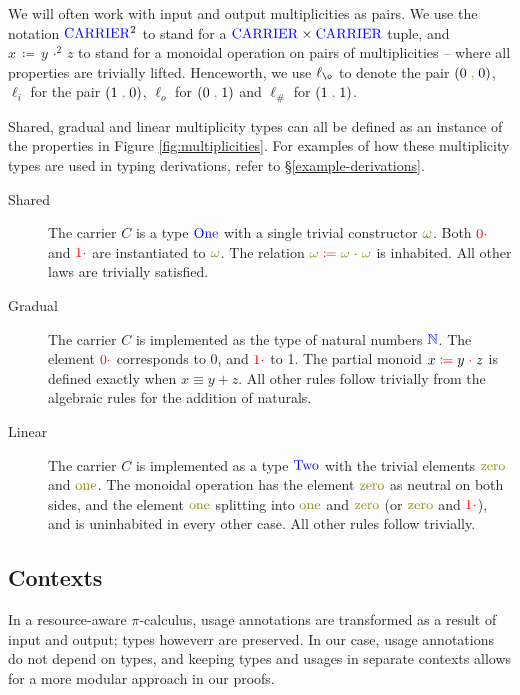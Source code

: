 \documentclass[a4paper,UKenglish,cleveref, autoref, thm-restate,authorcolumns]{lipics-v2019}
\theoremstyle{definition}
\newcommand{\picalc}{$\pi$-calculus}
\newcommand{\type}[1]{\textcolor{blue}{\operatorname{#1}}}
\newcommand{\constr}[1]{\textcolor{olive}{\operatorname{#1}}}
\newcommand{\field}[1]{\textcolor{red}{\operatorname{#1}}}
\newcommand{\comma}{\; \constr{,} \;}
\newcommand{\opsquared}[3]{#1 \, \coloneqq \, #2 \, \cdot^2 \, #3}
\newcommand{\op}[3]{#1 \; \field{\coloneqq} \; #2 \; \field{\cdot} \; #3}
\newcommand{\zero}{\field{0\cdot}}
\newcommand{\one}{\field{1\cdot}}
\newcommand{\Carrier}{\type{CARRIER}}
\newcommand{\N}{\type{\mathbb{N}}}
\begin{document}
\begin{note}
  We will often work with input and output multiplicities as pairs.
  We use the notation $\Carrier^2$ to stand for a $\Carrier \times \Carrier$ tuple, and $\opsquared{x}{y}{z}$ to stand for a monoidal operation on pairs of multiplicities -- where all properties are trivially lifted.
  Henceworth, we use $\ell_{\o}$ to denote the pair $(0 \comma 0)$, $\ell_i$ for the pair $(1 \comma 0)$, $\ell_o$ for $(0 \comma 1)$ and $\ell_{\#}$ for $(1 \comma 1)$.
\end{note}

Shared, gradual and linear multiplicity types can all be defined as an instance of the properties in Figure \ref{fig:multiplicities}.
For examples of how these multiplicity types are used in typing derivations, refer to \S \ref{example-derivations}.

\begin{description}
  \item [Shared]
    The carrier $C$ is a type $\type{One}$ with a single trivial constructor $\constr{\omega}$.
    Both $\zero$ and $\one$ are instantiated to $\constr{\omega}$.
    The relation $\op{\constr{\omega}}{\constr{\omega}}{\constr{\omega}}$ is inhabited.
    All other laws are trivially satisfied.
  \item [Gradual]
    The carrier $C$ is implemented as the type of natural numbers $\N$.
    The element $\zero$ corresponds to 0, and $\one$ to 1.
    The partial monoid $\op{x}{y}{z}$ is defined exactly when $x \equiv y + z$.
    All other rules follow trivially from the algebraic rules for the addition of naturals.
  \item [Linear]
    The carrier $C$ is implemented as a type $\type{Two}$ with the trivial elements $\constr{zero}$ and $\constr{one}$.
    The monoidal operation has the element $\constr{zero}$ as neutral on both sides, and the element $\constr{one}$ splitting into $\constr{one}$ and $\constr{zero}$ (or $\constr{zero}$ and $\constr{\one}$), and is uninhabited in every other case.
    All other rules follow trivially.
\end{description}

\subsection{Contexts}
\label{contexts}

In a resource-aware \picalc{}, usage annotations are transformed as a result of input and output; types howeverr are preserved.
In our case, usage annotations do not depend on types, and keeping types and usages in separate contexts allows for a more modular approach in our proofs.
\end{document}
